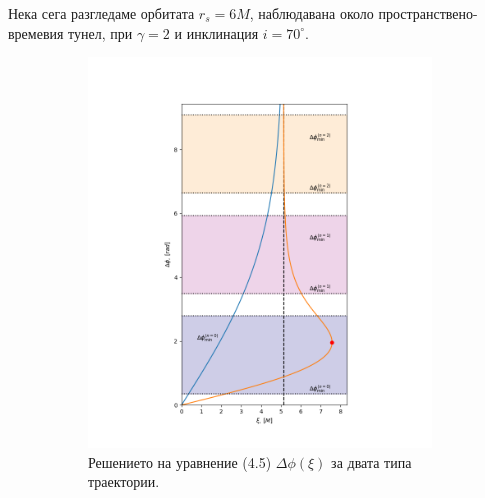 \documentclass[12pt]{article}
\numberwithin{equation}{section}
\numberwithin{figure}{section}
\begin{document}
	Нека сега разгледаме орбитата $r_s = 6M$, наблюдавана около пространствено-времевия тунел, при $\gamma = 2$ и инклинация $i = 70^\circ$.
	\begin{figure}[h]
		\centering
		\begin{subfigure}{6cm}
			\centering
			\includegraphics[scale = 0.3]{Section_6_Morphology_of_the images_of_horizonless_spacetimes/WH_70_deg_r6_impact_gamma_2.png}
			\caption{Решението на уравнение (4.5) $\Delta\phi(\xi)$ за двата типа траектории.} \label{fig:1a}
		\end{subfigure}\,\,\,
		\begin{subfigure}{6cm}
			\centering

\end{subfigure}
\end{figure}
\end{document}
